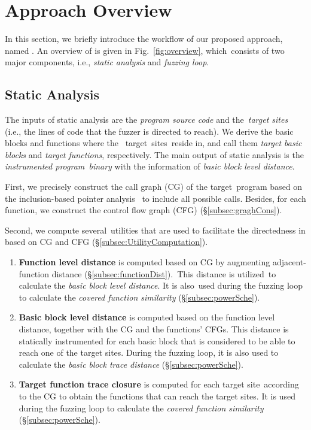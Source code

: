  

\section{Approach Overview}

In this section, we briefly introduce the workflow of our proposed approach, named \dFOT. An overview of \dFOT is given in Fig.~\ref{fig:overview}, which~consists of two major components, i.e., \textit{static analysis} and \textit{fuzzing loop}. 



\subsection{Static Analysis}\label{subsec:static_flow}

The inputs of static analysis are the \textit{program source code} and the~\textit{target sites} (i.e., the lines of code that the fuzzer is directed to reach). We derive the basic blocks and functions where the ~target~sites~reside in, and call them \textit{target basic blocks} and \textit{target functions}, respectively. The main output of static analysis is the \textit{instrumented program~binary} with the information of \textit{basic block level distance}.

First, we precisely construct the call graph (CG) of the target~program based on the inclusion-based pointer analysis~\cite{Andersen94programanalysis} to include all possible  calls. Besides, for each function, we construct the  control flow graph (CFG) (\S\ref{subsec:graghCons}).


Second, we compute several~utilities that are used to facilitate the directedness in \dFOT based on CG and CFG (\S\ref{subsec:UtilityComputation}).
\begin{enumerate}[(1)]
\item \textbf{Function level distance} is computed based on CG by augmenting adjacent-function distance (\S\ref{subsec:functionDist}).~This distance is utilized~to calculate the \textit{basic block level distance}. It is also~used during the fuzzing loop to calculate the \emph{covered function similarity} (\S\ref{subsec:powerSche}).
    
\item \textbf{Basic block level distance} is computed based on the function level distance, together with the CG and the functions' CFGs. This distance is statically instrumented for each basic block that is considered to be able to reach one of the target sites. During the fuzzing loop, it is also used to calculate the \emph{basic block trace distance} (\S\ref{subsec:powerSche}).

\item \textbf{Target function trace closure} is computed for each target site~according to the CG to obtain the functions that can reach the target sites. It is used during the fuzzing loop to calculate the \emph{covered function similarity} (\S\ref{subsec:powerSche}).
\end{enumerate}

